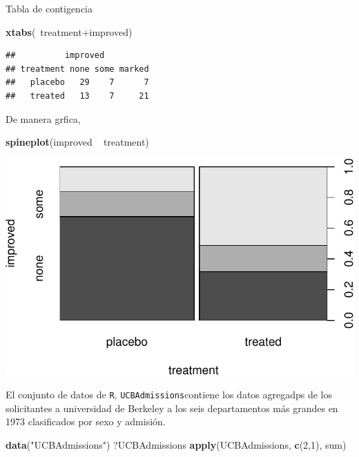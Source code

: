 \documentclass[]{article}
\newenvironment{Shaded}{\begin{snugshade}}{\end{snugshade}}
\newcommand{\KeywordTok}[1]{\textcolor[rgb]{0.13,0.29,0.53}{\textbf{{#1}}}}
\newcommand{\DecValTok}[1]{\textcolor[rgb]{0.00,0.00,0.81}{{#1}}}
\newcommand{\StringTok}[1]{\textcolor[rgb]{0.31,0.60,0.02}{{#1}}}
\newcommand{\NormalTok}[1]{{#1}}
\numberwithin{equation}{section}
\begin{document}
Tabla de contigencia

\begin{Shaded}
\begin{Highlighting}[]
\KeywordTok{xtabs}\NormalTok{(~treatment+improved)}
\end{Highlighting}
\end{Shaded}

\begin{verbatim}
##          improved
## treatment none some marked
##   placebo   29    7      7
##   treated   13    7     21
\end{verbatim}

De manera grfica,

\begin{Shaded}
\begin{Highlighting}[]
\KeywordTok{spineplot}\NormalTok{(improved ~}\StringTok{ }\NormalTok{treatment)}
\end{Highlighting}
\end{Shaded}

\includegraphics{tema1_files/figure-latex/unnamed-chunk-95-1.pdf}

El conjunto de datos de \texttt{R}, \texttt{UCBAdmissions}contiene los
datos agregadps de los solicitantes a universidad de Berkeley a los seis
departamentos más grandes en 1973 clasificados por sexo y admisión.

\begin{Shaded}
\begin{Highlighting}[]
\KeywordTok{data}\NormalTok{(}\StringTok{"UCBAdmissions"}\NormalTok{)}
\NormalTok{?UCBAdmissions}
\KeywordTok{apply}\NormalTok{(UCBAdmissions, }\KeywordTok{c}\NormalTok{(}\DecValTok{2}\NormalTok{,}\DecValTok{1}\NormalTok{), sum)}
\end{Highlighting}
\end{Shaded}
\end{document}
